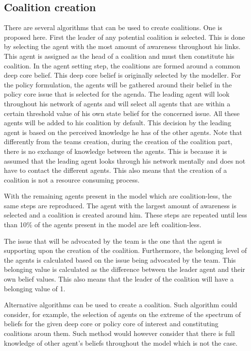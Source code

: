 \subsection{Coalition creation}


There are several algorithms that can be used to create coalitions. One is proposed here. First the leader of any potential coalition is selected. This is done by selecting the agent with the most amount of awareness throughout his links. This agent is assigned as the head of a coalition and must then constitute his coalition. In the agent setting step, the coalitions are formed around a common deep core belief. This deep core belief is originally selected by the modeller. For the policy formulation, the agents will be gathered around their belief in the policy core issue that is selected for the agenda. The leading agent will look throughout his network of agents and will select all agents that are within a certain threshold value of his own state belief for the concerned issue. All these agents will be added to his coalition by default. This decision by the leading agent is based on the perceived knowledge he has of the other agents. Note that differently from the teams creation, during the creation of the coalition part, there is no exchange of knowledge between the agents. This is because it is assumed that the leading agent looks through his network mentally and does not have to contact the different agents. This also means that the creation of a coalition is not a resource consuming process.


With the remaining agents present in the model which are coalition-less, the same steps are reproduced. The agent with the largest amount of awareness is selected and a coalition is created around him. These steps are repeated until less than 10\% of the agents present in the model are left coalition-less.


The issue that will be advocated by the team is the one that the agent is supporting upon the creation of the coalition. Furthermore, the belonging level of the agents is calculated based on the issue being advocated by the team. This belonging value is calculated as the difference between the leader agent and their own belief values. This also means that the leader of the coalition will have a belonging value of 1.


Alternative algorithms can be used to create a coalition. Such algorithm could consider, for example, the selection of agents on the extreme of the spectrum of beliefs for the given deep core or policy core of interest and constituting coalitions aroun them. Such method would however consider that there is full knowledge of other agent's beliefs throughout the model which is not the case.


